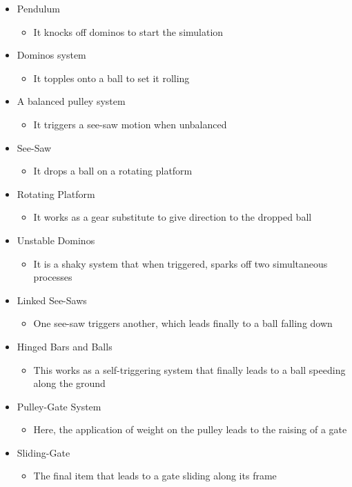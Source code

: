 \documentclass[a4paper,11pt]{article}
\begin{document}
\begin{itemize}

\item Pendulum 
\begin{itemize}
\item It knocks off dominos to start the simulation
\end{itemize}
\item Dominos system
\begin{itemize}
\item It topples onto a ball to set it rolling
\end{itemize}
\item A balanced pulley system
\begin{itemize}
\item It triggers a see-saw motion when unbalanced
\end{itemize}
\item See-Saw
\begin{itemize}
\item It drops a ball on a rotating platform
\end{itemize}
\item Rotating Platform
\begin{itemize}
\item It works as a gear substitute to give direction to the dropped ball
\end{itemize}
\item Unstable Dominos
\begin{itemize}
\item It is a shaky system that when triggered, sparks off two simultaneous processes
\end{itemize}
\item Linked See-Saws
\begin{itemize}
\item One see-saw triggers another, which leads finally to a ball falling down
\end{itemize}
\item Hinged Bars and Balls
\begin{itemize}
\item This works as a self-triggering system that finally leads to a ball speeding along the ground
\end{itemize}
\item Pulley-Gate System
\begin{itemize}
\item Here, the application of weight on the pulley leads to the raising of a gate
\end{itemize}
\item Sliding-Gate
\begin{itemize}
\item The final item that leads to a gate sliding along its frame
\end{itemize}

\end{itemize}
\end{document}
